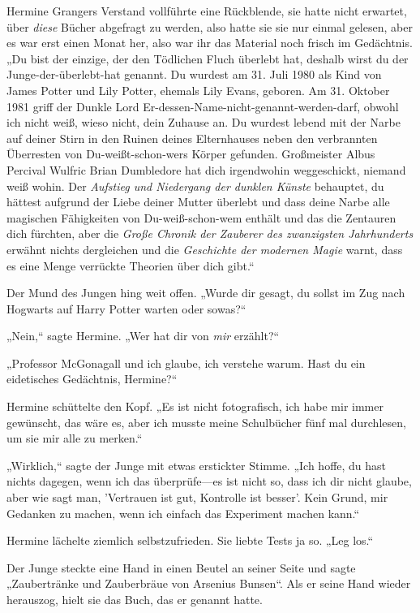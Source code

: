 {Hermine Grangers Verstand vollführte eine Rückblende, sie hatte nicht erwartet, über \emph{diese} Bücher abgefragt zu werden, also hatte sie sie nur einmal gelesen, aber es war erst einen Monat her, also war ihr das Material noch frisch im Gedächtnis. „Du bist der einzige, der den Tödlichen Fluch überlebt hat, deshalb wirst du der Junge-der-überlebt-hat genannt. Du wurdest am 31. Juli 1980 als Kind von James Potter und Lily Potter, ehemals Lily Evans, geboren. Am 31. Oktober 1981 griff der Dunkle Lord Er-dessen-Name-nicht-genannt-werden-darf, obwohl ich nicht weiß, wieso nicht, dein Zuhause an. Du wurdest lebend mit der Narbe auf deiner Stirn in den Ruinen deines Elternhauses neben den verbrannten Überresten von Du-weißt-schon-wers Körper gefunden. Großmeister Albus Percival Wulfric Brian Dumbledore hat dich irgendwohin weggeschickt, niemand weiß wohin. Der \emph{Aufstieg und Niedergang der dunklen Künste} behauptet, du hättest aufgrund der Liebe deiner Mutter überlebt und dass deine Narbe alle magischen Fähigkeiten von Du-weiß-schon-wem enthält und das die Zentauren dich fürchten, aber die \emph{Große Chronik der Zauberer des zwanzigsten Jahrhunderts} erwähnt nichts dergleichen und die \emph{Geschichte der modernen Magie} warnt, dass es eine Menge verrückte Theorien über dich gibt.“

Der Mund des Jungen hing weit offen. „Wurde dir gesagt, du sollst im Zug nach Hogwarts auf Harry Potter warten oder sowas?“

„Nein,“ sagte Hermine. „Wer hat dir von \emph{mir} erzählt?“

„Professor McGonagall und ich glaube, ich verstehe warum. Hast du ein eidetisches Gedächtnis, Hermine?“

Hermine schüttelte den Kopf. „Es ist nicht fotografisch, ich habe mir immer gewünscht, das wäre es, aber ich musste meine Schulbücher fünf mal durchlesen, um sie mir alle zu merken.“

„Wirklich,“ sagte der Junge mit etwas erstickter Stimme. „Ich hoffe, du hast nichts dagegen, wenn ich das überprüfe—es ist nicht so, dass ich dir nicht glaube, aber wie sagt man, 'Vertrauen ist gut, Kontrolle ist besser'. Kein Grund, mir Gedanken zu machen, wenn ich einfach das Experiment machen kann.“

Hermine lächelte ziemlich selbstzufrieden. Sie liebte Tests ja so. „Leg los.“

Der Junge steckte eine Hand in einen Beutel an seiner Seite und sagte „Zaubertränke und Zauberbräue von Arsenius Bunsen“. Als er seine Hand wieder herauszog, hielt sie das Buch, das er genannt hatte.

}
